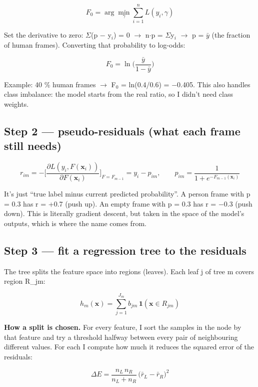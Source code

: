 \documentclass[11pt,a4paper]{article}
\begin{document}
\[
F_0 = \arg\min_{\gamma}\sum_{i=1}^{n} L(y_i, \gamma)
\]

Set the derivative to zero:
$\Sigma$(p $-$ y$_i$) = 0 $\rightarrow$ n$\cdot$p = $\Sigma$y$_i$ $\rightarrow$ p
= $\bar{y}$ (the fraction of human
frames). Converting that
probability to log-odds:

\[
F_0 = \ln\Big(\frac{\bar y}{1-\bar y}\Big)
\]

Example: 40 \% human frames $\rightarrow$
F$_0$ = ln(0.4/0.6) = $-$0.405.
This also handles class
imbalance: the model starts
from the real ratio, so I
didn't need class weights.

\hypertarget{step-2-pseudo-residuals-what-each-frame-still-needs}{%
\subsection{Step 2 ---
pseudo-residuals (what each
frame still
needs)}\label{step-2-pseudo-residuals-what-each-frame-still-needs}}

\[
r_{im} = -\Big[\frac{\partial L(y_i,F(\mathbf{x}_i))}{\partial F(\mathbf{x}_i)}\Big]_{F=F_{m-1}} = y_i - p_{im}, \qquad p_{im} = \frac{1}{1+e^{-F_{m-1}(\mathbf{x}_i)}}
\]

It's just ``true label minus
current predicted
probability''. A person frame
with p = 0.3 has r = +0.7
(push up). An empty frame with
p = 0.3 has r = $-$0.3 (push
down). This is literally
gradient descent, but taken in
the space of the model's
outputs, which is where the
name comes from.

\hypertarget{step-3-fit-a-regression-tree-to-the-residuals}{%
\subsection{Step 3 --- fit a
regression tree to the
residuals}\label{step-3-fit-a-regression-tree-to-the-residuals}}

The tree splits the feature
space into regions (leaves).
Each leaf j of tree m covers
region R\_jm:

\[
h_m(\mathbf{x}) = \sum_{j=1}^{J_m} b_{jm}\,\mathbf{1}(\mathbf{x}\in R_{jm})
\]

\textbf{How a split is
chosen.} For every feature, I
sort the samples in the node
by that feature and try a
threshold halfway between
every pair of neighbouring
different values. For each I
compute how much it reduces
the squared error of the
residuals:

\[
\Delta E = \frac{n_L\,n_R}{n_L + n_R}\,\big(\bar r_L - \bar r_R\big)^2
\]
\end{document}
